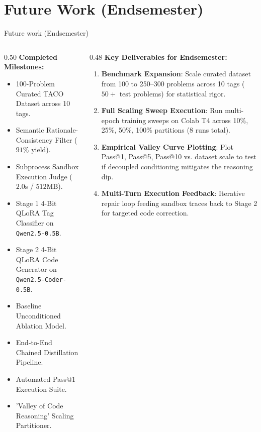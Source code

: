 \documentclass[aspectratio=169,10pt]{beamer}
\begin{document}
\section{Future Work (Endsemester)}

\begin{frame}{Future work (Endsemester)}
  \begin{columns}[T]
    \begin{column}{0.50\textwidth}
      \textbf{Completed Milestones:}
      \begin{itemize}\itemsep=3pt\footnotesize
        \item[$\checkmark$] 100-Problem Curated TACO Dataset across 10 tags.
        \item[$\checkmark$] Semantic Rationale-Consistency Filter ($91\%$ yield).
        \item[$\checkmark$] Subprocess Sandbox Execution Judge ($2.0\text{s}$ / $512\text{MB}$).
        \item[$\checkmark$] Stage 1 4-Bit QLoRA Tag Classifier on \texttt{Qwen2.5-0.5B}.
        \item[$\checkmark$] Stage 2 4-Bit QLoRA Code Generator on \texttt{Qwen2.5-Coder-0.5B}.
        \item[$\checkmark$] Baseline Unconditioned Ablation Model.
        \item[$\checkmark$] End-to-End Chained Distillation Pipeline.
        \item[$\checkmark$] Automated Pass@1 Execution Suite.
        \item[$\checkmark$] 'Valley of Code Reasoning' Scaling Partitioner.
      \end{itemize}
    \end{column}

    \begin{column}{0.48\textwidth}
      \textbf{Key Deliverables for Endsemester:}
      \begin{enumerate}\itemsep=3pt\footnotesize
        \item \textbf{Benchmark Expansion}:
          Scale curated dataset from 100 to 250--300 problems across 10 tags ($50+$ test problems) for statistical rigor.
        \item \textbf{Full Scaling Sweep Execution}:
          Run multi-epoch training sweeps on Colab T4 across 10\%, 25\%, 50\%, 100\% partitions (8 runs total).
        \item \textbf{Empirical Valley Curve Plotting}:
          Plot Pass@1, Pass@5, Pass@10 vs. dataset scale to test if decoupled conditioning mitigates the reasoning dip.
        \item \textbf{Multi-Turn Execution Feedback}:
          Iterative repair loop feeding sandbox traces back to Stage 2 for targeted code correction.
      \end{enumerate}
    \end{column}
  \end{columns}
\end{frame}
\end{document}
